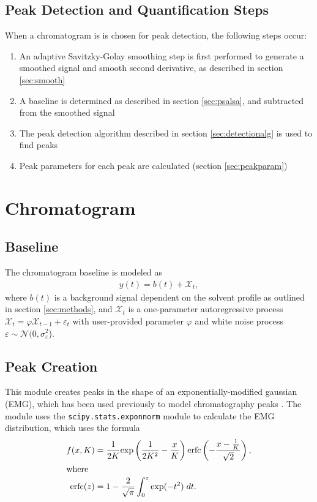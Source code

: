 \documentclass{article}
\begin{document}
\subsection{Peak Detection and Quantification Steps}
When a chromatogram is is chosen for peak detection, the following steps occur:
\begin{enumerate}
\item An adaptive Savitzky-Golay smoothing step is first performed to generate a smoothed signal and smooth second derivative, as described in section \ref{sec:smooth}
\item A baseline is determined as described in section \ref{sec:psalsa}, and subtracted from the smoothed signal
\item The peak detection algorithm described in section \ref{sec:detectionalg} is used to find peaks
\item Peak parameters for each peak are calculated (section \ref{sec:peakparam})
\end{enumerate}


\section{Chromatogram}


\subsection{Baseline}\label{sec:baseline}
The chromatogram baseline is modeled as 
\begin{align}
y(t) = b(t) + \mathcal{X}_t,
\end{align}
where $b(t)$ is a background signal dependent on the solvent profile as outlined in section \ref{sec:methods}, and $\mathcal{X}_t$ is a one-parameter autoregressive process $\mathcal{X}_t = \varphi \mathcal{X}_{t-1} + \varepsilon_t $ with user-provided parameter $\varphi$ and white noise process $\varepsilon \sim \mathcal{N}(0, \sigma^2_\varepsilon$).

\subsection{Peak Creation}
This module creates peaks in the shape of an exponentially-modified gaussian (EMG), which has been used previously to model chromatography peaks \cite{emg2,emg}. The module uses the \texttt{scipy.stats.exponnorm} module to calculate the EMG distribution, which uses the formula
\begin{align}
f(x,K) &= \frac{1}{2K}\text{exp}\left(\frac{1}{2K^2} - \frac{x}{K}\right)\text{erfc}\left(- \frac{x - \frac{1}{K}}{\sqrt{2}} \right), \\
\intertext{where}
\text{erfc}(z) &= 1 - \frac{2}{\sqrt{\pi}}\int_0^z \text{exp}(-t^2)\;dt. \nonumber
\end{align}
\end{document}
